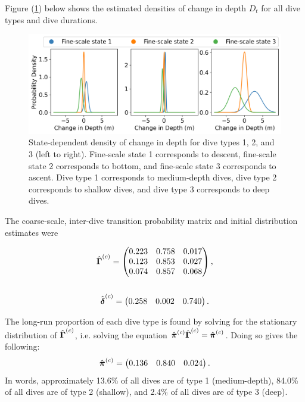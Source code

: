 \documentclass[12pt]{article}
\begin{document}
Figure (\ref{fig:emission_dist}) below shows the estimated densities of change in depth $D_t$ for all dive types and dive durations.

\begin{figure}[H]
    \centering
    \includegraphics[width=6.5in]{../plt/emission_dists_K_3_3_nWhales_8.png}
    \caption{State-dependent density of change in depth for dive types 1, 2, and 3 (left to right). Fine-scale state 1 corresponds to descent, fine-scale state 2 corresponds to bottom, and fine-scale state 3 corresponds to ascent. Dive type 1 corresponds to medium-depth dives, dive type 2 corresponds to shallow dives, and dive type 3 corresponds to deep dives.}
    \label{fig:emission_dist}
\end{figure}

The coarse-scale, inter-dive transition probability matrix and initial distribution estimates were 

\begin{gather}
    \hat {\boldsymbol{\Gamma}}^{(c)} = 
    \begin{pmatrix} 
    0.223 & 0.758 & 0.017 \\
    0.123 & 0.853 & 0.027 \\
    0.074 & 0.857 & 0.068
    \end{pmatrix}, \\ \nonumber \\
    \hat {\boldsymbol{\delta}}^{(c)} = \begin{pmatrix} 0.258 & 0.002 & 0.740 \end{pmatrix}.
\end{gather}

The long-run proportion of each dive type is found by solving for the stationary distribution of $\hat {\boldsymbol{\Gamma}}^{(c)}$, i.e. solving the equation $\hat {\boldsymbol{\pi}}^{(c)} \hat {\boldsymbol{\Gamma}}^{(c)} = \hat {\boldsymbol{\pi}}^{(c)}$. Doing so gives the following:
%
\begin{equation}
    \hat {\boldsymbol{\pi}}^{(c)} = 
    \begin{pmatrix}
        0.136 & 0.840 & 0.024
    \end{pmatrix}.
\end{equation}
%
In words, approximately 13.6\% of all dives are of type 1 (medium-depth), 84.0\% of all dives are of type 2 (shallow), and 2.4\% of all dives are of type 3 (deep).
\end{document}
